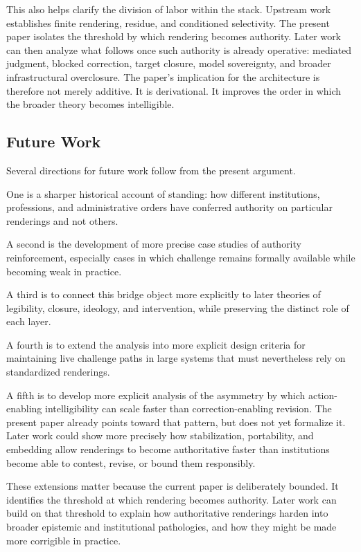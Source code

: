 \documentclass[11pt]{article}
\begin{document}
This also helps clarify the division of labor within the stack. Upstream work establishes finite rendering, residue, and conditioned selectivity. The present paper isolates the threshold by which rendering becomes authority. Later work can then analyze what follows once such authority is already operative: mediated judgment, blocked correction, target closure, model sovereignty, and broader infrastructural overclosure. The paper's implication for the architecture is therefore not merely additive. It is derivational. It improves the order in which the broader theory becomes intelligible.\cite{Swanson2026ConstrainedDescribability,Swanson2026MediatedJudgmentConstraint}

\subsection{Future Work}

Several directions for future work follow from the present argument.

One is a sharper historical account of standing: how different institutions, professions, and administrative orders have conferred authority on particular renderings and not others.

A second is the development of more precise case studies of authority reinforcement, especially cases in which challenge remains formally available while becoming weak in practice.

A third is to connect this bridge object more explicitly to later theories of legibility, closure, ideology, and intervention, while preserving the distinct role of each layer.

A fourth is to extend the analysis into more explicit design criteria for maintaining live challenge paths in large systems that must nevertheless rely on standardized renderings.

A fifth is to develop more explicit analysis of the asymmetry by which action-enabling intelligibility can scale faster than correction-enabling revision. The present paper already points toward that pattern, but does not yet formalize it. Later work could show more precisely how stabilization, portability, and embedding allow renderings to become authoritative faster than institutions become able to contest, revise, or bound them responsibly.

These extensions matter because the current paper is deliberately bounded. It identifies the threshold at which rendering becomes authority. Later work can build on that threshold to explain how authoritative renderings harden into broader epistemic and institutional pathologies, and how they might be made more corrigible in practice.
\end{document}
